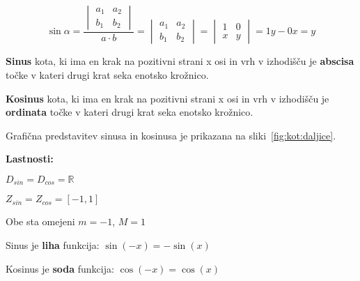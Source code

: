 \documentclass[a4paper,oneside,12pt,fleqn]{article}
\def\R{\ensuremath{\mathbb R}}
\newcommand\krat\cdot
\newcommand\kos\cos
\numberwithin{equation}{section}
\newenvironment{enumerate*}%
{
\vspace{-12pt}%
\begin{enumerate}%
\setlength{\itemsep}{0pt}%
\setlength{\parskip}{2pt}}%
{\end{enumerate}}
\begin{document}
\begin{equation}
  \sin\alpha = \frac{\begin{vmatrix} a_1 & a_2 \\ b_1 & b_2 \end{vmatrix}}{a\krat b} =
  \begin{vmatrix} a_1 & a_2 \\ b_1 & b_2 \end{vmatrix} =
  \begin{vmatrix} 1 & 0 \\ x & y \end{vmatrix} = 1y - 0x = y
  \label{eq:kot:sindef}
\end{equation}


\textbf{Sinus} kota, ki ima en krak na pozitivni strani x osi in vrh v izhodišču je
\textbf{abscisa} točke v kateri drugi krat seka enotsko krožnico.

\textbf{Kosinus} kota, ki ima en krak na pozitivni strani x osi in vrh v izhodišču je
\textbf{ordinata} točke v kateri drugi krat seka enotsko krožnico.

Grafična predstavitev sinusa in kosinusa je prikazana na sliki~\ref{fig:kot:daljice}.

\textbf{Lastnosti:}
\begin{enumerate*}
  \item $D_{sin} = D_{cos} = \R$
  \item $Z_{sin} = Z_{cos} = [-1,1]$
  \item Obe sta omejeni $m = -1$, $M = 1$
  \item Sinus je \textbf{liha} funkcija: $\sin(-x) = -\sin(x)$
  \item Kosinus je \textbf{soda} funkcija: $\kos(-x) = \kos(x)$
\end{enumerate*}
\end{document}
